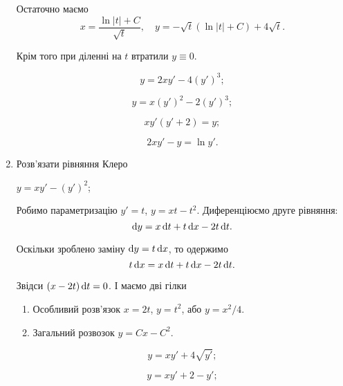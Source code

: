 \begin{enumerate}
\begin{solution}
		Остаточно маємо \[ x = \frac{\ln |t| + C}{\sqrt{t}}, \quad y = - \sqrt{t} (\ln |t| + C) + 4 \sqrt{t}. \] 

		Крім того при діленні на $t$ втратили $y \equiv 0$.
	\end{solution}

	\begin{multicols}{2}
		\begin{problem}
			\[ y = 2 x y' - 4 (y')^3;\]
		\end{problem}
	
		\begin{problem}
			\[ y = x (y')^2 - 2 (y')^3;\]
		\end{problem}
	
		\begin{problem}
		 	\[ x y' (y' + 2) = y;\]
		\end{problem}
	
		\begin{problem}
		 	\[ 2 x y' - y = \ln y'.\]
		\end{problem}
	\end{multicols}

	\item Розв'язати рівняння Клеро
	\begin{example}
		$y = x y' - (y')^2$;
	\end{example}
	
	\begin{solution}
		Робимо параметризацію $y' = t$, $y = x t - t^2$. Диференціюємо друге рівняння:
		\[ \mathop{}\!\mathrm{d} y = x \mathop{}\!\mathrm{d} t + t \mathop{}\!\mathrm{d} x - 2 t \mathop{}\!\mathrm{d} t.\]

		Оскільки зроблено заміну $\mathop{}\!\mathrm{d} y = t \mathop{}\!\mathrm{d} x$, то одержимо
		\[ t \mathop{}\!\mathrm{d} x = x \mathop{}\!\mathrm{d} t + t \mathop{}\!\mathrm{d} x - 2 t \mathop{}\!\mathrm{d} t.\]

		Звідси $(x - 2t) \mathop{}\!\mathrm{d} t = 0$. І маємо дві гілки
		\begin{enumerate}
			\item Особливий розв'язок $x = 2t$, $y = t^2$, або $y = x^2 / 4$.
			\item Загальний розвозок $y = C x - C^2$.
		\end{enumerate}
	\end{solution}

	\begin{multicols}{2}
		\begin{problem}
			\[ y=xy'+4\sqrt{y'}; \]
		\end{problem}
		
		\begin{problem}
			\[ y=xy'+2-y'; \]
		\end{problem}
		

\end{multicols}
\end{enumerate}
